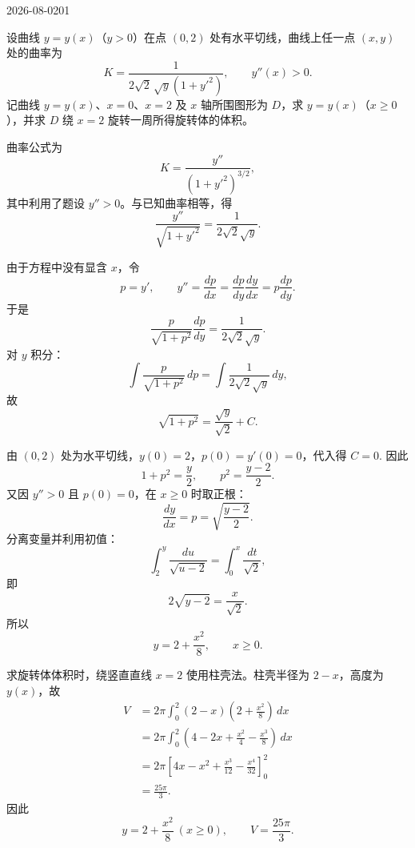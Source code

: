 \begin{mistake}{2026-08-02}{01}

\begin{problemcontent}
设曲线 \(y=y(x)\)（\(y>0\)）在点 \((0,2)\) 处有水平切线，曲线上任一点 \((x,y)\) 处的曲率为
\[
K=\frac{1}{2\sqrt{2}\,\sqrt{y}(1+y'^2)},\qquad y''(x)>0.
\]
记曲线 \(y=y(x)\)、\(x=0\)、\(x=2\) 及 \(x\) 轴所围图形为 \(D\)，求 \(y=y(x)\)（\(x\ge 0\)），并求 \(D\) 绕 \(x=2\) 旋转一周所得旋转体的体积。
\end{problemcontent}

\begin{solutioncontent}
曲率公式为
\[
K=\frac{y''}{(1+y'^2)^{3/2}},
\]
其中利用了题设 \(y''>0\)。与已知曲率相等，得
\[
\frac{y''}{\sqrt{1+y'^2}}=\frac{1}{2\sqrt{2}\sqrt y}.
\]

由于方程中没有显含 \(x\)，令
\[
p=y',\qquad y''=\frac{dp}{dx}=\frac{dp}{dy}\frac{dy}{dx}=p\frac{dp}{dy}.
\]
于是
\[
\frac{p}{\sqrt{1+p^2}}\frac{dp}{dy}=\frac{1}{2\sqrt{2}\sqrt y}.
\]
对 \(y\) 积分：
\[
\int\frac{p}{\sqrt{1+p^2}}\,dp
=\int\frac{1}{2\sqrt{2}\sqrt y}\,dy,
\]
故
\[
\sqrt{1+p^2}=\frac{\sqrt y}{\sqrt2}+C.
\]

由 \((0,2)\) 处为水平切线，\(y(0)=2\)，\(p(0)=y'(0)=0\)，代入得 \(C=0\). 因此
\[
1+p^2=\frac y2,
\qquad p^2=\frac{y-2}{2}.
\]
又因 \(y''>0\) 且 \(p(0)=0\)，在 \(x\ge0\) 时取正根：
\[
\frac{dy}{dx}=p=\sqrt{\frac{y-2}{2}}.
\]
分离变量并利用初值：
\[
\int_2^y\frac{du}{\sqrt{u-2}}=\int_0^x\frac{dt}{\sqrt2},
\]
即
\[
2\sqrt{y-2}=\frac{x}{\sqrt2}.
\]
所以
\[
y=2+\frac{x^2}{8},\qquad x\ge0.
\]

求旋转体体积时，绕竖直直线 \(x=2\) 使用柱壳法。柱壳半径为 \(2-x\)，高度为 \(y(x)\)，故
\[
\begin{aligned}
V
&=2\pi\int_0^2(2-x)\left(2+\frac{x^2}{8}\right)\,dx\\
&=2\pi\int_0^2\left(4-2x+\frac{x^2}{4}-\frac{x^3}{8}\right)\,dx\\
&=2\pi\left[4x-x^2+\frac{x^3}{12}-\frac{x^4}{32}\right]_0^2\\
&=\frac{25\pi}{3}.
\end{aligned}
\]
因此
\[
\boxed{y=2+\frac{x^2}{8}\ (x\ge0)},
\qquad
\boxed{V=\frac{25\pi}{3}}.
\]
\end{solutioncontent}


\end{mistake}
